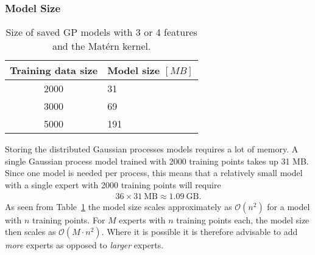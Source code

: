 \documentclass[twoside,english]{uiofysmaster}
\begin{document}
\subsubsection{Model Size}

\begin{table}
\centering
\begin{tabular}{@{}cl@{}} \toprule
Training data size & Model size $[MB]$\\
\midrule
2000 & 31\\
3000 & 69\\
5000 & 191\\ \bottomrule
\end{tabular}
\caption{Size of saved GP models with 3 or 4 features and the Mat\'{e}rn kernel.}
\label{Tab:: results : model size vs training points}
\end{table}


Storing the distributed Gaussian processes models requires a lot of memory. A single Gaussian process model trained with 2000 training points takes up 31 MB. Since one model is needed per process, this means that a relatively small model with a single expert with 2000 training points will require
\begin{align}
36 \times 31~ \text{MB} \approx 1.09~\text{GB}.
\end{align}
As seen from Table~\ref{Tab:: results : model size vs training points} the model size scales approximately as $\mathcal{O}( n^2)$ for a model with $n$ training points. For $M$ experts with $n$ training points each, the model size then scales as $\mathcal{O}(M\cdot n^2)$. Where it is possible it is therefore advisable to add \textit{more} experts as opposed to \textit{larger} experts.  
\end{document}
